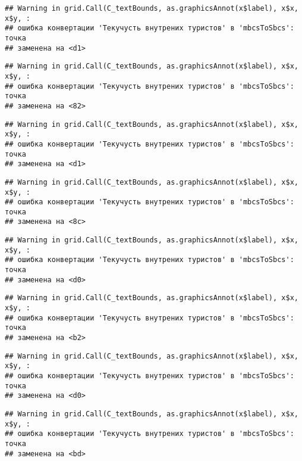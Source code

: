 \documentclass[
]{article}
\begin{document}
\begin{verbatim}
## Warning in grid.Call(C_textBounds, as.graphicsAnnot(x$label), x$x, x$y, :
## ошибка конвертации 'Текучусть внутрених туристов' в 'mbcsToSbcs': точка
## заменена на <d1>
\end{verbatim}

\begin{verbatim}
## Warning in grid.Call(C_textBounds, as.graphicsAnnot(x$label), x$x, x$y, :
## ошибка конвертации 'Текучусть внутрених туристов' в 'mbcsToSbcs': точка
## заменена на <82>
\end{verbatim}

\begin{verbatim}
## Warning in grid.Call(C_textBounds, as.graphicsAnnot(x$label), x$x, x$y, :
## ошибка конвертации 'Текучусть внутрених туристов' в 'mbcsToSbcs': точка
## заменена на <d1>
\end{verbatim}

\begin{verbatim}
## Warning in grid.Call(C_textBounds, as.graphicsAnnot(x$label), x$x, x$y, :
## ошибка конвертации 'Текучусть внутрених туристов' в 'mbcsToSbcs': точка
## заменена на <8c>
\end{verbatim}

\begin{verbatim}
## Warning in grid.Call(C_textBounds, as.graphicsAnnot(x$label), x$x, x$y, :
## ошибка конвертации 'Текучусть внутрених туристов' в 'mbcsToSbcs': точка
## заменена на <d0>
\end{verbatim}

\begin{verbatim}
## Warning in grid.Call(C_textBounds, as.graphicsAnnot(x$label), x$x, x$y, :
## ошибка конвертации 'Текучусть внутрених туристов' в 'mbcsToSbcs': точка
## заменена на <b2>
\end{verbatim}

\begin{verbatim}
## Warning in grid.Call(C_textBounds, as.graphicsAnnot(x$label), x$x, x$y, :
## ошибка конвертации 'Текучусть внутрених туристов' в 'mbcsToSbcs': точка
## заменена на <d0>
\end{verbatim}

\begin{verbatim}
## Warning in grid.Call(C_textBounds, as.graphicsAnnot(x$label), x$x, x$y, :
## ошибка конвертации 'Текучусть внутрених туристов' в 'mbcsToSbcs': точка
## заменена на <bd>
\end{verbatim}
\end{document}
